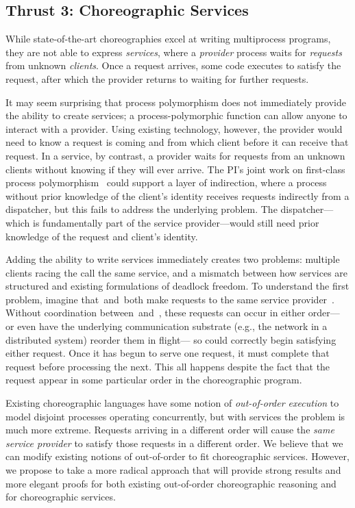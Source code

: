 \subsection{Thrust 3: Choreographic Services}
\label{sec:t3}

While state-of-the-art choreographies excel at writing multiprocess programs, they are not able to express \emph{services},
where a \emph{provider} process waits for \emph{requests} from unknown \emph{clients}.
Once a request arrives, some code executes to satisfy the request, after which the provider returns to waiting for further requests.

It may seem surprising that process polymorphism does not immediately provide the ability to create services;
a process-polymorphic function can allow anyone to interact with a provider.
Using existing technology, however, the provider would need to know a request is coming and from which client before it can receive that request.
In a service, by contrast, a provider waits for requests from an unknown clients without knowing if they will ever arrive.
The PI's joint work on first-class process polymorphism~\cite{SamuelsonHC25} could support a layer of indirection,
where a process without prior knowledge of the client's identity receives requests indirectly from a dispatcher,
but this fails to address the underlying problem.
The dispatcher---which is fundamentally part of the service provider---would still need prior knowledge of the request and client's identity.

Adding the ability to write services immediately creates two problems:
multiple clients racing the call the same service,
and a mismatch between how services are structured and existing formulations of deadlock freedom.
To understand the first problem, imagine that~\Alice and~\Bob both make requests to the same service provider~\Server.
Without coordination between~\Alice and~\Bob, these requests can occur in either order---%
or even have the underlying communication substrate (e.g., the network in a distributed system) reorder them in flight---%
so \Server could correctly begin satisfying either request.
Once it has begun to serve one request, it must complete that request before processing the next.
This all happens despite the fact that the request appear in some particular order in the choreographic program.

Existing choreographic languages have some notion of \emph{out-of-order execution}
to model disjoint processes operating concurrently, but with services the problem is much more extreme.
Requests arriving in a different order will cause the \emph{same service provider} to satisfy those requests in a different order.
We believe that we can modify existing notions of out-of-order to fit choreographic services.
However, we propose to take a more radical approach that will provide strong results and more elegant proofs
for both existing out-of-order choreographic reasoning and for choreographic services.

